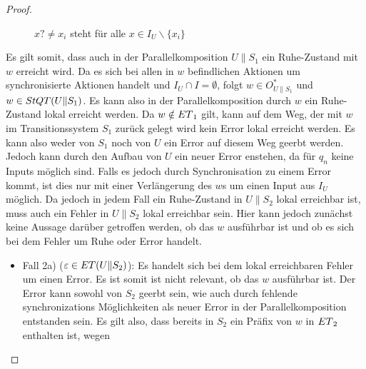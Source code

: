 \begin{proof}
\begin{itemize}
\begin{figure} [h!tbp]
\begin{center}
        \caption{$x?\neq x_i$ steht für alle $x\in I_U\backslash\{x_i\}$}
\label{UohneEmitI}
      \end{center}
      \end{figure}
      Es gilt somit, dass auch in der Parallelkomposition $U\|S_1$ ein
      Ruhe-Zustand mit $w$ erreicht wird. Da es sich bei allen in $w$
      befindlichen Aktionen um synchronisierte Aktionen handelt und $I_U\cap
      I=\emptyset$, folgt $w\in O_{U\|S_1}^*$ und $w\in StQT{}(U\|S_1)$. Es
      kann also in der Parallelkomposition durch $w$ ein Ruhe-Zustand lokal
      erreicht werden. Da $w\notin ET{}_1$ gilt, kann auf dem Weg, der mit
      $w$ im Transitionssystem $S_1$ zurück gelegt wird kein Error lokal
      erreicht werden. Es kann also weder von $S_1$ noch von $U$ ein Error auf
      diesem Weg geerbt werden. Jedoch kann durch den Aufbau von $U$ ein neuer
      Error enstehen, da für $q_n$ keine Inputs möglich sind. Falls es jedoch
      durch Synchronisation zu einem Error kommt, ist dies nur mit einer
      Verlängerung des $w$s um einen Input aus $I_U$ möglich. Da jedoch in
      jedem Fall ein Ruhe-Zustand in $U\|S_2$ lokal erreichbar ist, muss auch ein
      Fehler in $U\|S_2$ lokal erreichbar sein. Hier kann jedoch zunächst keine
      Aussage darüber getroffen werden, ob das $w$ ausführbar ist und ob es
      sich bei dem Fehler um Ruhe oder Error handelt.
      \begin{itemize}
        \item Fall 2a) ($\varepsilon\in ET{}(U\|S_2)$): Es handelt sich bei
          dem lokal erreichbaren Fehler um einen Error. Es ist somit ist nicht
          relevant, ob
          das $w$ ausführbar ist. Der Error kann sowohl von $S_2$ geerbt sein,
          wie auch durch fehlende synchronizations Möglichkeiten als neuer
          Error in der Parallelkomposition entstanden sein. Es gilt also, dass
          bereits in $S_2$ ein Präfix von $w$ in $ET{}_2$ enthalten ist, wegen

\end{itemize}
\end{itemize}
\end{proof}
